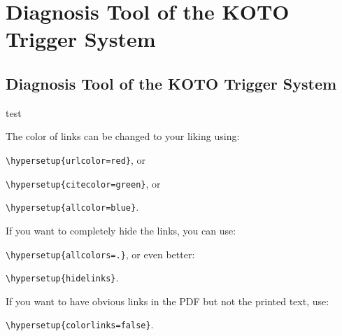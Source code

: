 
\chapter{Diagnosis Tool of the KOTO Trigger System} %

\label{AppendixA} %

\section{Diagnosis Tool of the KOTO Trigger System}
test



The color of links can be changed to your liking using:

{\small\verb!\hypersetup{urlcolor=red}!}, or

{\small\verb!\hypersetup{citecolor=green}!}, or

{\small\verb!\hypersetup{allcolor=blue}!}.

\noindent If you want to completely hide the links, you can use:

{\small\verb!\hypersetup{allcolors=.}!}, or even better: 

{\small\verb!\hypersetup{hidelinks}!}.

\noindent If you want to have obvious links in the PDF but not the printed text, use:

{\small\verb!\hypersetup{colorlinks=false}!}.
